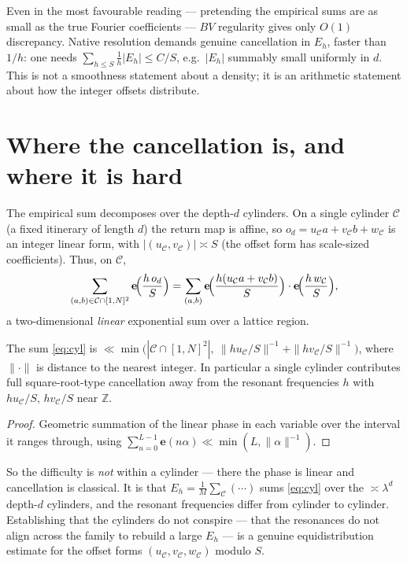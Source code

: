 \documentclass[11pt]{article}
\theoremstyle{remark}\newtheorem{remark}{Remark}
\newcommand{\Z}{\mathbb{Z}}\newcommand{\R}{\mathbf{R}}\newcommand{\D}{\mathcal D}
\newcommand{\e}{\mathbf e}\newcommand{\Lop}{\mathcal L}\newcommand{\var}{\operatorname{var}}
\begin{document}
Even in the most favourable reading --- pretending the empirical sums are as
small as the true Fourier coefficients --- $BV$ regularity gives only $O(1)$
discrepancy. Native resolution demands genuine cancellation in $E_h$, faster
than $1/h$: one needs $\sum_{h\le S}\tfrac1h|E_h|\le C/S$, e.g.\ $|E_h|$
summably small uniformly in $d$. This is not a smoothness statement about a
density; it is an arithmetic statement about how the integer offsets distribute.

\section{Where the cancellation is, and where it is hard}
The empirical sum decomposes over the depth-$d$ cylinders. On a single cylinder
$\mathcal C$ (a fixed itinerary of length $d$) the return map is affine, so
$o_d=u_{\mathcal C}a+v_{\mathcal C}b+w_{\mathcal C}$ is an integer linear form,
with $|(u_{\mathcal C},v_{\mathcal C})|\asymp S$ (the offset form has
scale-sized coefficients). Thus, on $\mathcal C$,
\begin{equation}\label{eq:cyl}
\sum_{(a,b)\in\mathcal C\cap[1,N]^2}\e\!\Bigl(\frac{h\,o_d}{S}\Bigr)
=\sum_{(a,b)}\e\!\Bigl(\frac{h(u_{\mathcal C}a+v_{\mathcal C}b)}{S}\Bigr)\cdot
\e\!\Bigl(\frac{h\,w_{\mathcal C}}{S}\Bigr),
\end{equation}
a two-dimensional \emph{linear} exponential sum over a lattice region.

\begin{lemma}\label{l:cyl}
The sum \eqref{eq:cyl} is $\ll \min\bigl(|\mathcal C\cap[1,N]^2|,\
\|h u_{\mathcal C}/S\|^{-1}+\|h v_{\mathcal C}/S\|^{-1}\bigr)$, where
$\|\cdot\|$ is distance to the nearest integer. In particular a single cylinder
contributes full square-root-type cancellation away from the resonant
frequencies $h$ with $h u_{\mathcal C}/S,\,h v_{\mathcal C}/S$ near $\Z$.
\end{lemma}
\begin{proof}
Geometric summation of the linear phase in each variable over the interval it
ranges through, using $\sum_{n=0}^{L-1}\e(n\alpha)\ll\min(L,\|\alpha\|^{-1})$.
\end{proof}

So the difficulty is \emph{not} within a cylinder --- there the phase is linear
and cancellation is classical. It is that $E_h=\tfrac1M\sum_{\mathcal C}(\cdots)$
sums \eqref{eq:cyl} over the $\asymp\lambda^{d}$ depth-$d$ cylinders, and the
resonant frequencies differ from cylinder to cylinder. Establishing that the
cylinders do not conspire --- that the resonances do not align across the
family to rebuild a large $E_h$ --- is a genuine equidistribution estimate for
the offset forms $(u_{\mathcal C},v_{\mathcal C},w_{\mathcal C})$ modulo $S$.
\end{document}
